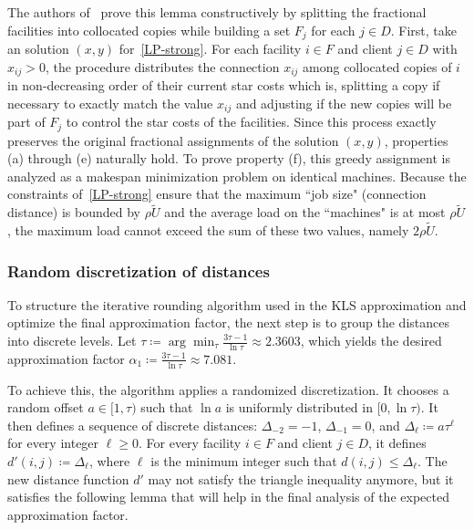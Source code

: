 The authors of~\cite{KLS2018} prove this lemma constructively by splitting the fractional facilities into collocated copies while building a set $F_j$ for each $j \in D$. First, take an solution $(x,y)$ for~\eqref{LP-strong}. For each facility $i \in F$ and client $j \in D$ with $x_{ij} > 0$, the procedure distributes the connection $x_{ij}$ among collocated copies of $i$ in non-decreasing order of their current star costs which is, splitting a copy if necessary to exactly match the value $x_{ij}$ and adjusting if the new copies will be part of $F_j$ to control the star costs of the facilities. Since this process exactly preserves the original fractional assignments of the solution $(x, y)$, properties (a) through (e) naturally hold. To prove property (f), this greedy assignment is analyzed as a makespan minimization problem on identical machines. Because the constraints of~\eqref{LP-strong} ensure that the maximum ``job size" (connection distance) is bounded by $\rho \tilde{U}$ and the average load on the ``machines" is at most $\rho \tilde{U}$, the maximum load cannot exceed the sum of these two values, namely $2\rho \tilde{U}$.

\subsubsection{Random discretization of distances}
\label{random_discretization_of_distances}

To structure the iterative rounding algorithm used in the KLS approximation and optimize the final approximation factor, the next step is to group the distances into discrete levels. Let $\tau \coloneqq \arg\min_{\tau} \frac{3\tau-1}{\ln \tau} \approx 2.3603$, which yields the desired approximation factor $\alpha_1 \coloneqq \frac{3\tau-1}{\ln \tau} \approx 7.081$.

To achieve this, the algorithm applies a randomized discretization. It chooses a random offset $a \in [1, \tau)$ such that $\ln a$ is uniformly distributed in $[0, \ln \tau)$. It then defines a sequence of discrete distances: $\Delta_{-2} = -1$, $\Delta_{-1} = 0$, and $\Delta_\ell \coloneqq a\tau^\ell$ for every integer $\ell \ge 0$.
For every facility $i \in F$ and client $j \in D$, it defines $d'(i,j) \coloneqq \Delta_\ell$, where $\ell$ is the minimum integer such that $d(i,j) \le \Delta_\ell$. The new distance function $d'$ may not satisfy the triangle inequality anymore, but it satisfies the following lemma that will help in the final analysis of the expected approximation factor.

